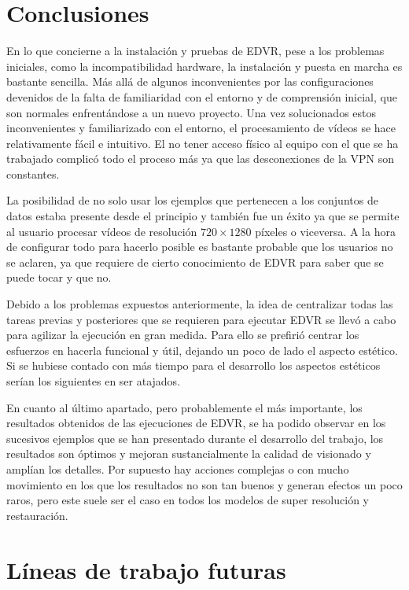 
\section{Conclusiones}
    En lo que concierne a la instalación y pruebas de EDVR, pese a los problemas iniciales, como la incompatibilidad hardware, la instalación y puesta en marcha es bastante sencilla. Más allá de algunos inconvenientes por las configuraciones devenidos de la falta de familiaridad con el entorno y de comprensión inicial, que son normales enfrentándose a un nuevo proyecto. Una vez solucionados estos inconvenientes y familiarizado con el entorno, el procesamiento de vídeos se hace relativamente fácil e intuitivo. El no tener acceso físico al equipo con el que se ha trabajado complicó todo el proceso más ya que las desconexiones de la VPN son constantes.
    
    La posibilidad de no solo usar los ejemplos que pertenecen a los conjuntos de datos estaba presente desde el principio y también fue un éxito ya que se permite al usuario procesar vídeos de resolución $720\times 1280$ píxeles  o viceversa. A la hora de configurar todo para hacerlo posible es bastante probable que los usuarios no se aclaren, ya que requiere de cierto conocimiento de EDVR para saber que se puede tocar y que no. 
    
    Debido a los problemas expuestos anteriormente, la idea de centralizar todas las tareas previas y posteriores que se requieren  para ejecutar EDVR se llevó a cabo para agilizar la ejecución en gran medida. Para ello se prefirió centrar los esfuerzos en hacerla funcional y útil, dejando un poco de lado el aspecto estético. Si se hubiese contado con más tiempo para el desarrollo los aspectos estéticos serían los siguientes en ser atajados.
    
    En cuanto al último apartado, pero probablemente el más importante, los resultados obtenidos de las ejecuciones de EDVR, se ha podido observar en los sucesivos ejemplos que se han presentado durante el desarrollo del trabajo, los resultados son óptimos y mejoran sustancialmente la calidad de visionado y amplían los detalles. Por supuesto hay acciones complejas o con mucho movimiento en los que los resultados no son tan buenos y  generan efectos un poco raros, pero este suele ser el caso en todos los modelos de super resolución y restauración.

\section{Líneas de trabajo futuras}

